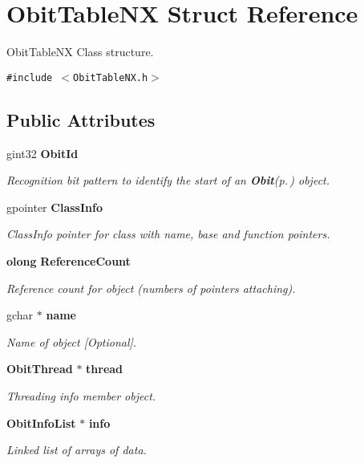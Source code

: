 \section{Obit\-Table\-NX Struct Reference}
\label{structObitTableNX}
Obit\-Table\-NX Class structure.  


{\tt \#include $<$Obit\-Table\-NX.h$>$}

\subsection*{Public Attributes}
\begin{CompactItemize}
\item 
gint32 {\bf Obit\-Id}
\begin{CompactList}\small\item\em Recognition bit pattern to identify the start of an {\bf Obit}{\rm (p.\,\pageref{structObit})} object. \item\end{CompactList}\item 
gpointer {\bf Class\-Info}
\begin{CompactList}\small\item\em Class\-Info pointer for class with name, base and function pointers. \item\end{CompactList}\item 
{\bf olong} {\bf Reference\-Count}
\begin{CompactList}\small\item\em Reference count for object (numbers of pointers attaching). \item\end{CompactList}\item 
gchar $\ast$ {\bf name}
\begin{CompactList}\small\item\em Name of object [Optional]. \item\end{CompactList}\item 
{\bf Obit\-Thread} $\ast$ {\bf thread}
\begin{CompactList}\small\item\em Threading info member object. \item\end{CompactList}\item 
{\bf Obit\-Info\-List} $\ast$ {\bf info}
\begin{CompactList}\small\item\em Linked list of arrays of data. \item\end{CompactList}\item 

\end{CompactItemize}
